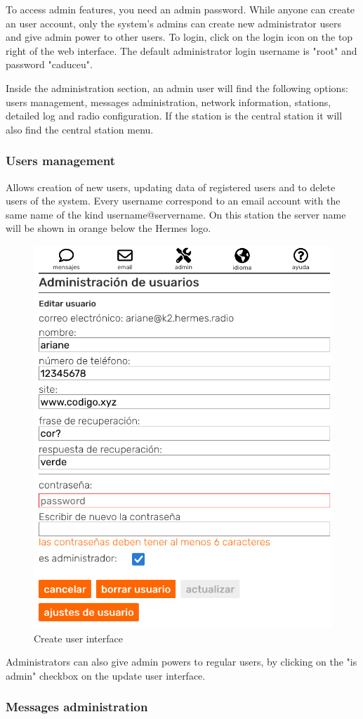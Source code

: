 \documentclass[11pt,a4paper]{article}
\begin{document}
To access admin features, you need an admin password. While anyone can create an user account, only the system's admins can create new administrator users and give admin power to other users. To login, click on the login icon on the top right of the web interface. The default administrator login username is "root" and password "caduceu".

Inside the administration section, an admin user will find the following options: users management, messages administration, network information, stations, detailed log and radio configuration. If the station is the central station it will also find the central station menu.

\subsubsection{Users management} 

Allows creation of new users, updating data of registered users and to delete users of the system. Every username correspond to an email account with the same name of the kind username@servername. On this station the server name will be shown in orange below the Hermes logo.
    
    \begin{figure}[H]
    \centering
    \includegraphics[width=0.5\columnwidth]{screenshots/frontend/es/createuser.png}
    \caption{Create user interface}
    \label{fig:createuser}
    \end{figure}
    
    Administrators can also give admin powers to regular users, by clicking on the "is admin" checkbox on the update user interface.

\subsubsection{Messages administration}  
\label{gui_msg_admin}
\end{document}
